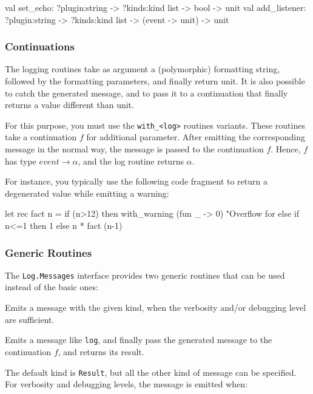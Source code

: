 \begin{ocamlcode}
val set_echo:     ?plugin:string -> ?kinds:kind list -> bool -> unit
val add_listener: ?plugin:string -> ?kinds:kind list -> (event -> unit) -> unit
\end{ocamlcode}

\subsubsection{Continuations}

The logging routines take as argument a (polymorphic) formatting
string, followed by the formatting parameters, and finally return
unit. It is also possible to catch the generated message, and to pass
it to a continuation that finally returns a value different than unit.

For this purpose, you must use the \texttt{with\_<log>} routines
variants. These routines take a continuation $f$ for additional
parameter. After emitting the corresponding message in the normal
way, the message is passed to the continuation $f$. Hence, $f$ has
type $\mathit{event}\rightarrow\alpha$, and the log routine returns
$\alpha$.

For instance, you typically use the following code fragment to return
a degenerated value while emitting a warning:
\begin{ocamlcode}
  let rec fact n =
    if (n>12) then
      with_warning (fun _ -> 0) "Overflow for %
    else if n<=1 then 1 else n * fact (n-1)
\end{ocamlcode}

\subsubsection{Generic Routines}

The \lstinline{Log.Messages} interface provides two generic routines
that can be used instead of the basic ones:

\begin{description}
  Emits a message with the given kind, when the verbosity and/or
  debugging level are sufficient.

  Emits a message like \texttt{log}, and finally pass the generated
  message to the continuation $f$, and returns its result.
\end{description}

The default kind is \lstinline{Result}, but all the other kind of
message can be specified. For verbosity and debugging levels, the
message is emitted when:

